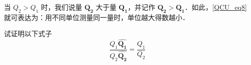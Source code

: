 当 $Q_2>Q_1$ 时，我们说量 $\boldsymbol{Q_2}$ 大于量 $\boldsymbol{Q_1}$，并记作 $\boldsymbol{Q_2}>\boldsymbol{Q_1}$．如此，\autoref{QCU_eq8} 就可表达为：用不同单位测量同一量时，单位越大得数越小．
\begin{example}{}
试证明以下式子
\begin{equation}
\frac{Q_1\hat{\boldsymbol{Q_1}}}{Q_2\hat{\boldsymbol{Q_2}}}=\frac{Q_1}{Q_2}{}
\end{equation}

\end{example}